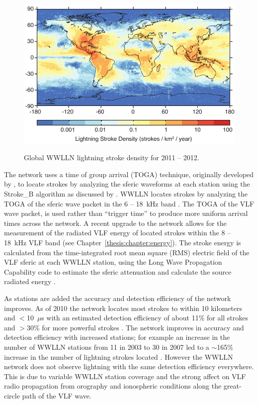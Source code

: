 \begin{figure}[ht!]
	\centering
	\includegraphics[scale=1]{Introduction/Figures/wwlln_density.pdf}\\
	\caption{Global WWLLN lightning stroke density for 2011 -- 2012.}
	\label{intro:fig:wwlln}
\end{figure}

The network uses a time of group arrival (TOGA) technique, originally developed by \citet{Dowden2002d}, to locate strokes by analyzing the sferic waveforms at each station using the Stroke\_B algorithm as discussed by \citet{Rodger2006,Rodger2009}.
WWLLN locates strokes by analyzing the TOGA of the sferic wave packet in the 6 -- 18~kHz band \citep{Dowden2000}.
The TOGA of the VLF wave packet, is used rather than ``trigger time'' to produce more uniform arrival times across the network.
A recent upgrade to the network allows for the measurement of the radiated VLF energy of located strokes within the 8 -- 18~kHz VLF band (see Chapter~\ref{thesis:chapter:energy}).
The stroke energy is calculated from the time-integrated root mean square (RMS) electric field of the VLF sferic at each WWLLN station, using the Long Wave Propagation Capability code \citep{Ferguson1998} to estimate the sferic attenuation and calculate the source radiated energy \citep{Hutchins2012}.

As stations are added the accuracy and detection efficiency of the network improves.
As of 2010 the network locates most strokes to within 10 kilometers and $<$10~$\mu$s with an estimated detection efficiency of about 11\% for all strokes and $>$30\% for more powerful strokes \citep{Abarca2010,Rodger2009}.
The network improves in accuracy and detection efficiency with increased stations; for example an increase in the number of WWLLN stations from 11 in 2003 to 30 in 2007 led to a $\sim$165\% increase in the number of lightning strokes located \citep{Rodger2009}.
However the WWLLN network does not observe lightning with the same detection efficiency everywhere.
This is due to variable WWLLN station coverage and the strong affect on VLF radio propagation from orography and ionospheric conditions along the great-circle path of the VLF wave.

